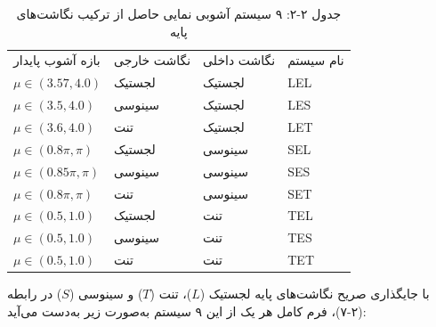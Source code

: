 \begin{table}[h]
\centering
\small
\begin{tabular}{llll}
\hline
بازه آشوب پایدار & نگاشت خارجی & نگاشت داخلی & نام سیستم \\
$\mu \in (3.57, 4.0)$ & لجستیک & لجستیک & LEL \\
$\mu \in (3.5, 4.0)$ & سینوسی & لجستیک & LES \\
$\mu \in (3.6, 4.0)$ & تنت & لجستیک & LET \\
$\mu \in (0.8\pi, \pi)$ & لجستیک & سینوسی & SEL \\
$\mu \in (0.85\pi, \pi)$ & سینوسی & سینوسی & SES \\
$\mu \in (0.8\pi, \pi)$ & تنت & سینوسی & SET \\
$\mu \in (0.5, 1.0)$ & لجستیک & تنت & TEL \\
$\mu \in (0.5, 1.0)$ & سینوسی & تنت & TES \\
$\mu \in (0.5, 1.0)$ & تنت & تنت & TET \\
\hline
\end{tabular}
\caption{جدول ‏۲‏-‏۲‏: ۹ سیستم آشوبی نمایی حاصل از ترکیب نگاشت‌های پایه \cite{ref4}}

\end{table}

با جایگذاری صریح نگاشت‌های پایه لجستیک ($L$)، تنت ($T$) و سینوسی ($S$) در رابطه (۲-۷)، فرم کامل هر یک از این ۹ سیستم به‌صورت زیر به‌دست می‌آید:

